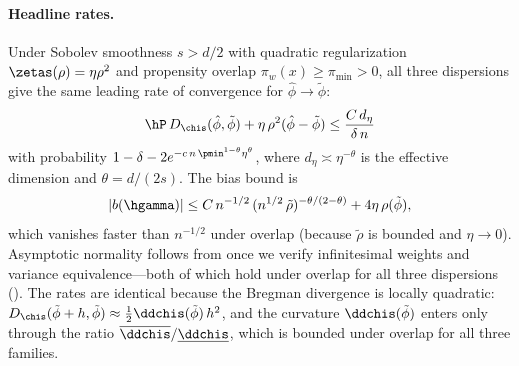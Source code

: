 \documentclass{article}
\begin{document}
\paragraph{Headline rates.}
Under Sobolev smoothness $s > d/2$
with quadratic regularization
$\zetas(\rho) = \eta\rho^2$
and propensity overlap $\pi_w(x) \ge \pi_{\min} > 0$,
all three dispersions give the same leading rate
of convergence for $\hat\phi \to \tilde\phi$:
\[
\hP\, D_{\chis}(\hat\phi, \tilde\phi)
  + \eta\,\rho^2(\hat\phi - \tilde\phi)
  \le \frac{C\, d_\eta}{\delta\, n}
\]
with probability $1 - \delta - 2e^{-c\, n\, \pmin^{1-\theta}\eta^\theta}$,
where $d_\eta \asymp \eta^{-\theta}$
is the effective dimension
and $\theta = d/(2s)$.
The bias bound is
\[
|b(\hgamma)|
  \le C\, n^{-1/2}\,
    (n^{1/2}\,\tilde\rho)^{-\theta/(2-\theta)}
  + 4\eta\,\rho(\tilde\phi),
\]
which vanishes faster than $n^{-1/2}$
under overlap
(because $\tilde\rho$ is bounded and $\eta \to 0$).
Asymptotic normality follows from
once we verify infinitesimal weights
and variance equivalence---both
of which hold under overlap
for all three dispersions
().
The rates are identical
because the Bregman divergence is locally quadratic:
$D_{\chis}(\tilde\phi + h, \tilde\phi)
  \approx \frac{1}{2}\ddchis(\tilde\phi)\,h^2$,
and the curvature $\ddchis(\tilde\phi)$
enters only through the ratio
$\overline{\ddchis}/\underline{\ddchis}$,
which is bounded under overlap
for all three families.
\end{document}
